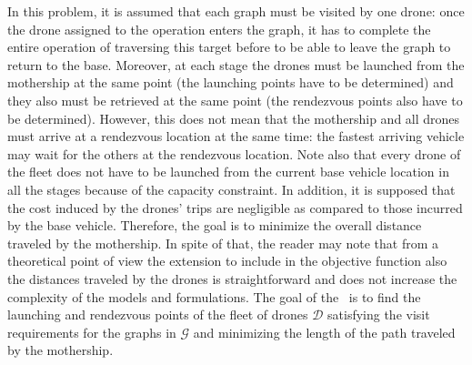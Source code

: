 \noindent
In this problem, it is assumed that each graph must be visited by one drone: once the drone assigned to the operation enters the graph, it has to complete the entire operation of traversing this target before to be able to leave the graph to return to the base. Moreover, at each stage the drones must be launched from the mothership at the same point (the launching points have to be determined) and they also must be retrieved at the same point (the rendezvous points also have to be determined). However, this does not mean that the mothership and all drones must arrive at a rendezvous location at the same time: the fastest arriving vehicle may wait for the others at the rendezvous location. Note also that every drone of the fleet does not have to be launched from the current base vehicle location in all the stages because of the capacity constraint. In addition, it is supposed that the cost induced by the drones' trips are negligible as compared to those incurred by the base vehicle. Therefore, the goal is to minimize the overall distance traveled by the mothership. In spite of that, the reader may note that from a theoretical point of view the extension to include in the objective function also the distances traveled by the drones is straightforward and does not increase the complexity of the models and formulations.
\noindent
The goal of the \AMD \ is to find the launching and rendezvous points of the fleet of drones $\mathcal D$ satisfying the visit requirements for the graphs in $\mathcal G$ and minimizing the length of the path traveled by the mothership.\\

\noindent



